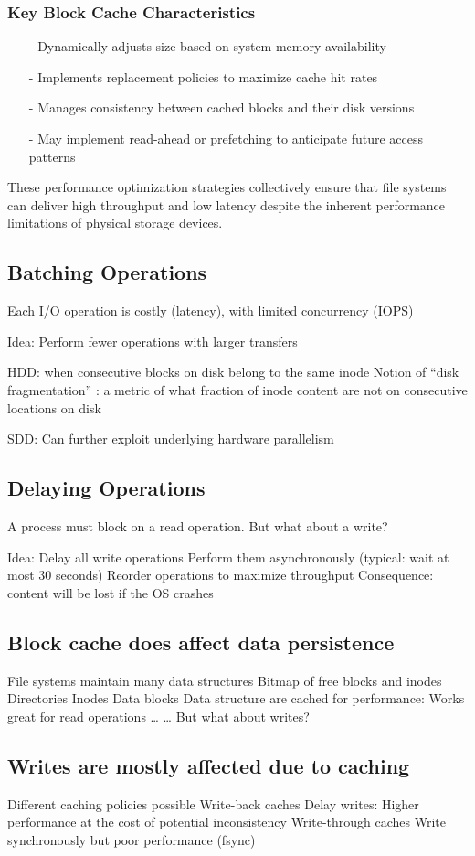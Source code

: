 \documentclass[../../compsys.tex]{subfiles}
\begin{document}
\subsubsection{Key Block Cache Characteristics}
\begin{itemize}
  \item[-] Dynamically adjusts size based on system memory availability
  \item[-] Implements replacement policies to maximize cache hit rates
  \item[-] Manages consistency between cached blocks and their disk versions
  \item[-] May implement read-ahead or prefetching to anticipate future access patterns
\end{itemize}

These performance optimization strategies collectively ensure that file systems can deliver high throughput and low latency despite the inherent performance limitations of physical storage devices.

\subsection{Batching Operations}
Each I/O operation is costly (latency), with limited concurrency (IOPS)

Idea: Perform fewer operations with larger transfers

HDD: when consecutive blocks on disk belong to the same inode
Notion of “disk fragmentation” : a metric of what fraction of inode content are not on consecutive locations on disk

SDD: Can further exploit underlying hardware parallelism

\subsection{Delaying Operations}
A process must block on a read operation.  But what about a write?

Idea: Delay all write operations
Perform them asynchronously (typical: wait at most 30 seconds)
Reorder operations to maximize throughput 
Consequence: content will be lost if the OS crashes
\subsection{Block cache does affect data persistence}
File systems maintain many data structures
Bitmap of free blocks and inodes 
Directories
Inodes
Data blocks
Data structure are cached for performance:
Works great for read operations …
… But what about writes?

\subsection{Writes are mostly affected due to caching}
Different caching policies possible
Write-back caches
Delay writes: Higher performance at the cost of potential inconsistency
Write-through caches
Write synchronously but poor performance (fsync)
\end{document}

